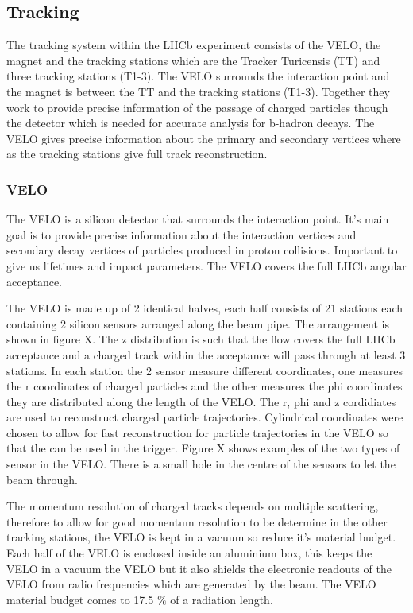 \subsection{Tracking}


The tracking system within the LHCb experiment consists of the VELO, the magnet and the tracking stations which are the Tracker Turicensis (TT) and three tracking stations (T1-3). The VELO surrounds the interaction point and the magnet is between the TT and the tracking stations (T1-3). Together they work to provide precise information of the passage of charged particles though the detector which is needed for accurate analysis for b-hadron decays. The VELO gives precise information about the primary and secondary vertices where as the tracking stations give full track reconstruction. 

\subsubsection{VELO}
The VELO is a silicon detector that surrounds the interaction point. It’s main goal is to provide precise information about the interaction vertices and secondary decay vertices of particles produced in proton collisions. Important to give us lifetimes and impact parameters. The VELO covers the full LHCb angular acceptance.

The VELO is made up of 2 identical halves, each half consists of 21 stations each containing 2 silicon sensors arranged along the beam pipe. The arrangement is shown in figure X. The z distribution is such that the flow covers the full LHCb acceptance and a charged track within the acceptance will pass through at least 3 stations. In each station the 2 sensor measure different coordinates, one measures the r coordinates of charged particles and the other measures the phi coordinates they are distributed along the length of the VELO. The r, phi and z cordidiates are used to reconstruct charged particle trajectories. Cylindrical coordinates were chosen to allow for fast reconstruction for particle trajectories in the VELO so that the can be used in the trigger. Figure X shows examples of the two types of sensor in the VELO. There is a small hole in the centre of the sensors to let the beam through.

The momentum resolution of charged tracks depends on multiple scattering, therefore to allow for good momentum resolution to be determine in the other tracking stations, the VELO is kept in a vacuum so reduce it’s material budget. Each half of the VELO is enclosed inside an aluminium box, this keeps the VELO in a  vacuum the VELO but it also shields the electronic readouts of the VELO from radio frequencies which are generated by the beam. The VELO material budget comes to 17.5 $\%$ of a radiation length.

